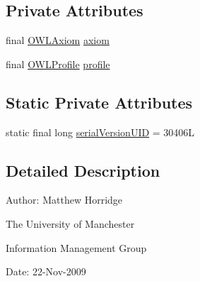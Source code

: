 \subsection*{Private Attributes}
\begin{DoxyCompactItemize}
\item 
final \hyperlink{interfaceorg_1_1semanticweb_1_1owlapi_1_1model_1_1_o_w_l_axiom}{O\-W\-L\-Axiom} \hyperlink{classorg_1_1semanticweb_1_1owlapi_1_1reasoner_1_1_axiom_not_in_profile_exception_ae6e3e5be0835bbc8d96e11ceef0a3663}{axiom}
\item 
final \hyperlink{interfaceorg_1_1semanticweb_1_1owlapi_1_1profiles_1_1_o_w_l_profile}{O\-W\-L\-Profile} \hyperlink{classorg_1_1semanticweb_1_1owlapi_1_1reasoner_1_1_axiom_not_in_profile_exception_aeb7d1f8593b50e6438679554d8137836}{profile}
\end{DoxyCompactItemize}
\subsection*{Static Private Attributes}
\begin{DoxyCompactItemize}
\item 
static final long \hyperlink{classorg_1_1semanticweb_1_1owlapi_1_1reasoner_1_1_axiom_not_in_profile_exception_ab8729844dcaa209745be54e1b98b716b}{serial\-Version\-U\-I\-D} = 30406\-L
\end{DoxyCompactItemize}


\subsection{Detailed Description}
Author\-: Matthew Horridge\par
 The University of Manchester\par
 Information Management Group\par
 Date\-: 22-\/\-Nov-\/2009 

